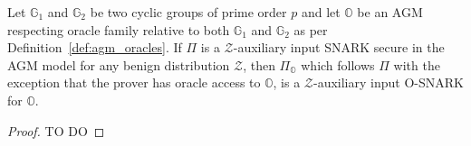\begin{corollary}
Let $\mathbb{G}_1$ and  $\mathbb{G}_2$ be two cyclic groups of prime order $p$ and let $\mathbb{O}$ be 
an AGM respecting oracle family relative to both $\mathbb{G}_1$ and $\mathbb{G}_2$ as per Definition~\ref{def:agm_oracles}. 
If $\Pi$ is a $\mathcal{Z}$-auxiliary input SNARK secure in the AGM model for any benign 
distribution $\mathcal{Z}$, then $\Pi_{\mathbb{O}}$ which follows $\Pi$ with the exception that the prover has oracle access 
to $\mathbb{O}$, is a $\mathcal{Z}$-auxiliary input O-SNARK for $\mathbb{O}$. 
\end{corollary}

\begin{proof} TO DO
\end{proof}

